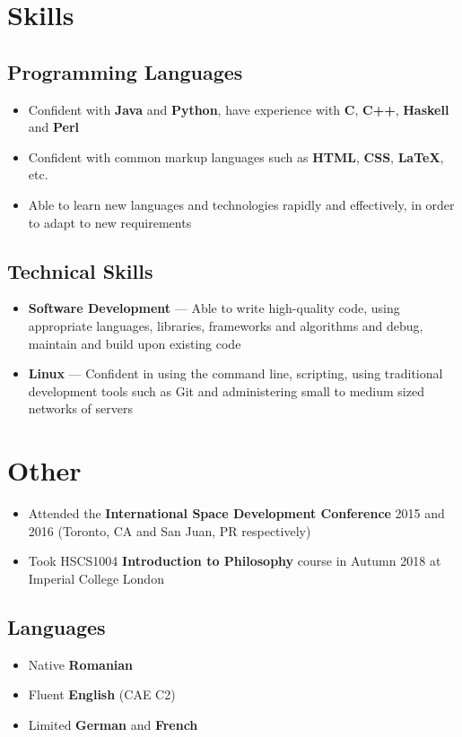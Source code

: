 \documentclass[a4paper]{article}
\begin{document}
\section*{Skills}

\subsection*{Programming Languages}
\begin{itemize}
	\item Confident with \textbf{Java} and \textbf{Python}, have experience with \textbf{C},
		\textbf{C++}, \textbf{Haskell} and \textbf{Perl}
	\item Confident with common markup languages such as \textbf{HTML},
		\textbf{CSS}, \textbf{{\LaTeX}}, etc.
	\item Able to learn new languages and technologies rapidly and effectively,
		in order to adapt to new requirements
\end{itemize}

\subsection*{Technical Skills}
\begin{itemize}
	\item \textbf{Software Development} --- Able to write high-quality code, using
		appropriate languages, libraries, frameworks and algorithms and debug,
		maintain and build upon existing code
	\item \textbf{Linux} --- Confident in using the command line, scripting, using
		traditional development tools such as Git and administering small to
		medium sized networks of servers
\end{itemize}

\section*{Other}
\begin{itemize}
	\item Attended the \textbf{International Space Development Conference} 2015
		and 2016 (Toronto, CA and San Juan, PR respectively)
	\item Took HSCS1004 \textbf{Introduction to Philosophy} course in Autumn 2018 at
		Imperial College London
\end{itemize}

\subsection*{Languages}
\begin{itemize}
	\item Native \textbf{Romanian}
	\item Fluent \textbf{English} (CAE C2)
	\item Limited \textbf{German} and \textbf{French}
\end{itemize}
\end{document}
